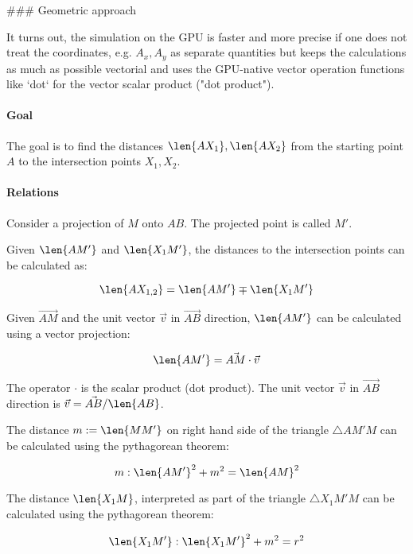 ### Geometric approach

It turns out, the simulation on the GPU is faster and more precise if one does not treat the coordinates, e.g. $A_x, A_y$ as separate quantities but keeps the calculations as much as possible vectorial and uses the GPU-native vector operation functions like `dot` for the vector scalar product ("dot product").


\paragraph{Goal} The goal is to find the distances $\len{AX_1}, \len{AX_2}$ from the starting point $A$ to the intersection points $X_1, X_2$.

\paragraph{Relations}

Consider a projection of $M$ onto $AB$. The projected point is called $M'$.

Given $\len{A M'}$ and $\len{X_1 M'}$, the distances to the intersection points can be calculated as:

\begin{equation} \len{A X_{1,2}} = \len{A M'} \mp \len{X_1 M'} \end{equation}

Given $\vec{AM}$ and the unit vector $\vec{v}$ in $\vec{AB}$ direction, $\len{AM'}$ can be calculated using a vector projection:

\begin{equation} \len{AM'} = \vec{AM} \cdot \vec{v} \end{equation}

The operator $\cdot$ is the scalar product (dot product). The unit vector $\vec{v}$ in $\vec{AB}$ direction is $\vec{v} = \vec{AB} / \len{AB}$.

The distance $m:=\len{MM'}$ on right hand side of the triangle $\triangle AM'M$ can be calculated using the pythagorean theorem:

\begin{equation} m: \len{AM'}^2 + m^2 = \len{AM}^2 \end{equation}

The distance $\len{X_1 M}$, interpreted as part of the triangle $\triangle X_1 M' M$ can be calculated using the pythagorean theorem:

\begin{equation} \len{X_1 M'}: \len{X_1 M'}^2 + m^2 = r^2 \end{equation}

